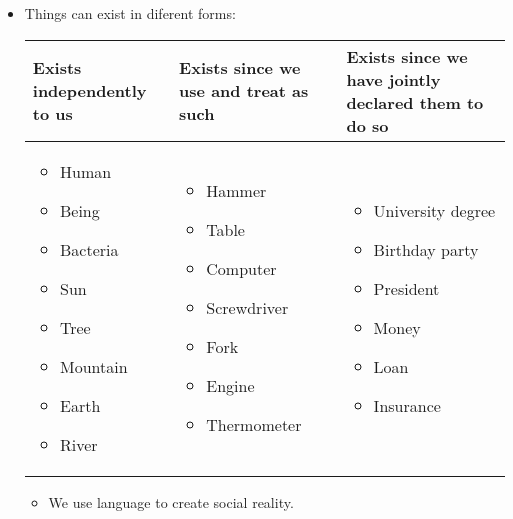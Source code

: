 \begin{itemize}
        
    \item Things can exist in diferent forms:
        \begin{center}
           \begin{tabular}{ | p{5cm} | p{5cm} | p{5cm} | }
               \hline
                   Exists independently to us & Exists since we use and treat as such & Exists since we have jointly declared them to do so     \\
               \hline
                    \begin{itemize}
                        \item Human
                        \item Being 
                        \item Bacteria 
                        \item Sun 
                        \item Tree 
                        \item Mountain 
                        \item Earth 
                        \item River 
                    \end{itemize}
                    & 
                    \begin{itemize}
                        \item Hammer 
                        \item Table 
                        \item Computer 
                        \item Screwdriver 
                        \item Fork 
                        \item Engine 
                        \item Thermometer
                    \end{itemize}
                    & 
                    \begin{itemize}
                        \item University degree 
                        \item Birthday party 
                        \item President 
                        \item Money 
                        \item Loan 
                        \item Insurance 
                    \end{itemize} 
                    \\ 
               \hline
           \end{tabular}
        \end{center}
        \begin{itemize}
            \item We use language to create social reality.
        \end{itemize}
\end{itemize}


